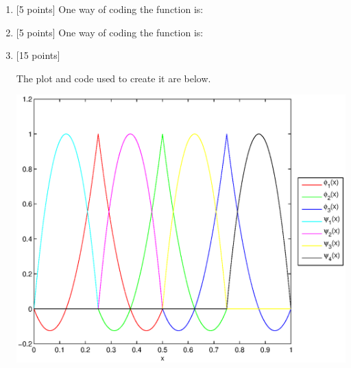 \begin{solution}
\begin{enumerate}
\item {[5 points]} 
One way of coding the function is:



\vspace*{1em}
\item {[5 points]} 
One way of coding the function is:



\vspace*{1em}
\item {[15 points]} 

The plot and code used to create it are below.

\begin{center}
\includegraphics[scale=0.7]{hw29c.eps}
\end{center}


\end{enumerate}
\end{solution}


